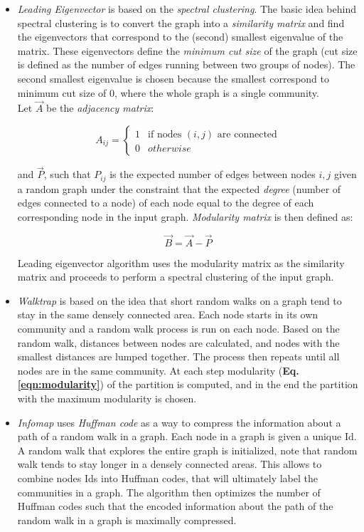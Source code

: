 \begin{itemize}
\item \textit{Leading Eigenvector}\cite{Newman_2006} is based on the \textit{spectral clustering}. The basic idea behind spectral clustering is to convert the graph into a \textit{similarity matrix} and find the eigenvectors that correspond to the (second) smallest eigenvalue of the matrix. These eigenvectors define the \textit{minimum cut size} of the graph (cut size is defined as the number of edges running between two groups of nodes). The second smallest eigenvalue is chosen because the smallest correspond to minimum cut size of 0, where the whole graph is a single community.\\
Let $\vec{A}$ be the  \textit{adjacency matrix}:

\begin{equation}
\label{eqn:adj_matrix}
A_{ij}=
\begin{cases}
	1 & \text{if nodes $(i,j)$ are connected}\\
	0 & otherwise
\end{cases}
\end{equation}

and $\vec{P}$, such that $P_{ij}$ is the expected number of edges between nodes $i,j$ given a random graph under the constraint that the expected \textit{degree} (number of edges connected to a node) of each node equal to the degree of each corresponding node in the input graph. \textit{Modularity matrix} is then defined as:

\begin{equation}
\label{eqn:modularity_matrix}
\vec{B}=\vec{A}-\vec{P}
\end{equation}

Leading eigenvector algorithm uses the modularity matrix as the similarity matrix and proceeds to perform a spectral clustering of the input graph.

\item \textit{Walktrap}\cite{Pons_2006} is based on the idea that short random walks on a graph tend to stay in the same densely connected area. Each node starts in its own community and a random walk process is run on each node. Based on the random walk, distances between nodes are calculated, and nodes with the smallest distances are lumped together. The process then repeats until all nodes are in the same community. At each step modularity (\textbf{Eq. \eqref{eqn:modularity}}) of the partition is computed, and in the end the partition with the maximum modularity is chosen.

\item \textit{Infomap}\cite{Rosvall_2009} uses \textit{Huffman code} as a way to compress the information about a path of a random walk in a graph.
Each node in a graph is given a unique Id. A random walk that explores the entire graph is initialized, note that random walk tends to stay longer in a densely connected areas. This allows to combine nodes Ids into Huffman codes, that will ultimately label the communities in a graph. The algorithm then optimizes the number of Huffman codes such that the encoded information about the path of the random walk in a graph is maximally compressed.


\end{itemize}

